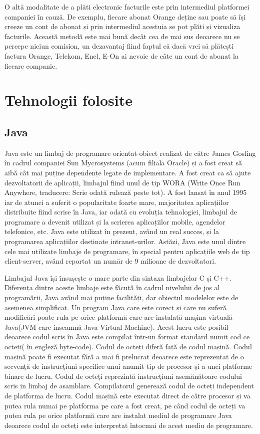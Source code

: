 \documentclass[12pt]{book}
\begin{document}
O altă modalitate de a plăti electronic facturile este prin intermediul platformei companiei în cauză. De exemplu, fiecare abonat Orange deține sau poate să își creeze un cont de abonat și prin intermediul acestuia se pot plăti și vizualiza facturile. Această metodă este mai bună decât cea de mai sus deoarece nu se percepe niciun comision, un dezavantaj fiind faptul că dacă vrei să plătești factura Orange, Telekom, Enel, E-On ai nevoie de câte un cont de abonat la fiecare companie. 

\chapter{Tehnologii folosite}
\section{Java}
	
Java este un limbaj de programare orientat-obiect realizat de către James Gosling în cadrul companiei Sun Mycrosystems (acum filiala Oracle) și a fost creat să aibă cât mai puține dependențe legate de implementare. A fost creat ca să ajute dezvoltatorii de aplicații, limbajul fiind unul de tip WORA (Write Once Run Anywhere, traducere: Scrie odată rulează peste tot).  A fost lansat în anul 1995 iar de atunci a suferit o popularitate foarte mare, majoritatea aplicațiilor distribuite fiind scrise în Java, iar odată cu evoluția tehnologiei, limbajul de programare a devenit utilizat și la scrierea aplicațiilor mobile, agendelor telefonice, etc. Java este utilizat în prezent, având un real succes, și la programarea aplicațiilor destinate intranet-urilor. Astăzi, Java este unul dintre cele mai utilizate limbaje de programare, în special pentru aplicațiile web de tip client-server, având reportat un număr de 9 milioane de dezvoltatori.\cite{thinkJava}
	
Limbajul Java își însușește o mare parte din sintaxa limbajelor C și C++. Diferența dintre aceste limbaje este făcută în cadrul nivelului de jos al programării, Java având mai puține facilități, dar obiectul modelelor este de asemenea simplificat. Un program Java care este corect și care nu suferă modificări poate rula pe orice platformă care are instalată mașina virtuală Java(JVM care inseamnă Java Virtual Machine). Acest lucru este posibil deoarece codul scris în Java este compilat într-un format standard numit cod ce octeți( în engleză byte-code). Codul de octeți diferă față de codul mașină. Codul mașină poate fi executat fără a mai fi prelucrat deoarece este reprezentat de o secvență de instrucțiuni specifice unui anumit tip de procesor și a unei platforme binare de lucru. Codul de octeți reprezintă instrucțiuni asemănătoare codului scris in limbaj de asamblare. Compilatorul generează codul de octeți independent de platforma de lucru. Codul mașină este executat direct de către procesor și va putea rula numai pe platforma pe care a fost creat, pe când codul de octeți va putea rula pe orice platformă care are instalat mediul de programare Java deoarece codul de octeți este interpretat întocmai de acest mediu de programare. \cite{cursPracticJava}
\end{document}
